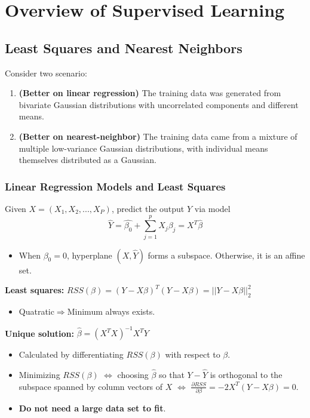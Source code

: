 \chapter{Overview of Supervised Learning}

\section{Least Squares and Nearest Neighbors}
Consider two scenario: 
\begin{enumerate}
	\item \textbf{(Better on linear regression)} The training data was generated from bivariate Gaussian distributions with uncorrelated components and different means. 
	\item \textbf{(Better on nearest-neighbor)} The training data came from a mixture of multiple low-variance Gaussian distributions, with individual means themselves distributed as a Gaussian. 
\end{enumerate}
\subsection{Linear Regression Models and Least Squares}
Given $X=(X_1,X_2,...,X_P)$, predict the output $Y$ via model
\begin{equation*}
\hat{Y}=\hat{\beta_0}+\sum_{j=1}^{p}X_j\hat{\beta_j}=X^T\hat{\beta}
\end{equation*}
\begin{itemize}
	\item When $\beta_0=0$, hyperplane $(X,\hat{Y})$ forms a subspace. Otherwise, it is an affine set. 
\end{itemize}

\textbf{Least squares: }$RSS(\beta)=(Y-X\beta)^T(Y-X\beta)=||Y-X\beta||_2^2$
\begin{itemize}
	\item Quatratic$\Rightarrow$Minimum always exists. 
\end{itemize}

\textbf{Unique solution: }$\hat{\beta}=(X^TX)^{-1}X^TY$
\begin{itemize}
	\item Calculated by differentiating $RSS(\beta)$ with respect to $\beta$. 
	\item Minimizing $RSS(\beta)$ $\Leftrightarrow$ choosing $\hat{\beta}$ so that $Y-\hat{Y}$ is orthogonal to the subspace spanned by column vectors of $X$ $\Leftrightarrow$ $\displaystyle\frac{\partial RSS}{\partial\beta}=-2X^T(Y-X\beta)=0$.
	\item \textbf{Do not need a large data set to fit}.  
\end{itemize}

